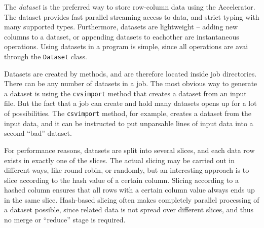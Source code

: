 
\label{chap:datasets}

The \textsl{dataset} is the preferred way to store row-column data
using the Accelerator.  The dataset provides fast parallel streaming
access to data, and strict typing with many supported types.
Furthermore, datasets are lightweight -- adding new columns to a
dataset, or appending datasets to eachother are instantaneous
operations.  Using datasets in a program is simple, since all
operations are avai through the \texttt{Dataset} class.

Datasets are created by methods, and are therefore located inside job
directories.  There can be any number of datasets in a job.  The most
obvious way to generate a dataset is using the
\texttt{cvsimport} method that creates a dataset from an input file.
But the fact that a job can create and hold many datasets opens up for
a lot of possibilities.  The \texttt{csvimport} method, for example,
creates a dataset from the input data, and it can be instructed to put
unparsable lines of input data into a second ``bad'' dataset.

For performance reasons, datasets are split into several slices, and
each data row exists in exactly one of the slices.  The actual slicing
may be carried out in different ways, like round robin, or randomly,
but an interesting approach is to slice according to the hash value of
a certain column.  Slicing according to a hashed column ensures that
all rows with a certain column value always ends up in the same slice.
Hash-based slicing often makes completely parallel processing of a
dataset possible, since related data is not spread over different
slices, and thus no merge or ``reduce'' stage is required.



